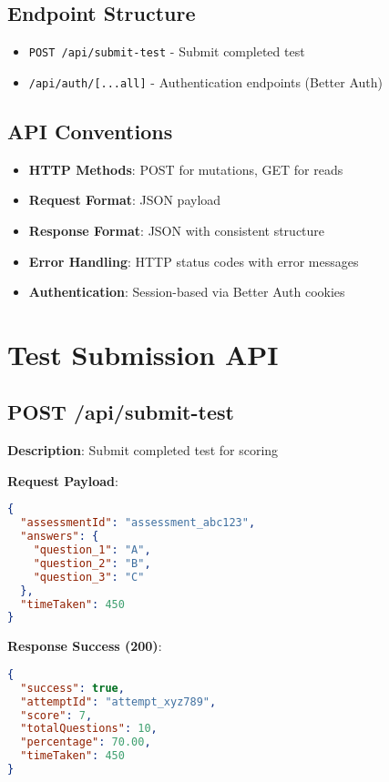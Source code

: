 \documentclass[12pt,a4paper]{report}
\begin{document}
\subsection{Endpoint Structure}

\begin{itemize}
    \item \texttt{POST /api/submit-test} - Submit completed test
    \item \texttt{/api/auth/[...all]} - Authentication endpoints (Better Auth)
\end{itemize}

\subsection{API Conventions}

\begin{itemize}
    \item \textbf{HTTP Methods}: POST for mutations, GET for reads
    \item \textbf{Request Format}: JSON payload
    \item \textbf{Response Format}: JSON with consistent structure
    \item \textbf{Error Handling}: HTTP status codes with error messages
    \item \textbf{Authentication}: Session-based via Better Auth cookies
\end{itemize}

\section{Test Submission API}

\subsection{POST /api/submit-test}

\textbf{Description}: Submit completed test for scoring

\textbf{Request Payload}:
\begin{lstlisting}[language=json]
{
  "assessmentId": "assessment_abc123",
  "answers": {
    "question_1": "A",
    "question_2": "B",
    "question_3": "C"
  },
  "timeTaken": 450
}
\end{lstlisting}

\textbf{Response Success (200)}:
\begin{lstlisting}[language=json]
{
  "success": true,
  "attemptId": "attempt_xyz789",
  "score": 7,
  "totalQuestions": 10,
  "percentage": 70.00,
  "timeTaken": 450
}
\end{lstlisting}
\end{document}
